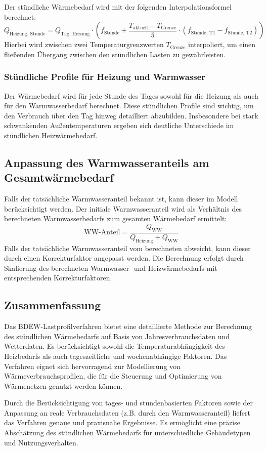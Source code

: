 Der stündliche Wärmebedarf wird mit der folgenden Interpolationsformel berechnet:
\[
Q_{\text{Heizung, Stunde}} = Q_{\text{Tag, Heizung}} \cdot \left( f_{\text{Stunde}} + \frac{T_{\text{aktuell}} - T_{\text{Grenze}}}{5} \cdot (f_{\text{Stunde, T1}} - f_{\text{Stunde, T2}}) \right)
\]
Hierbei wird zwischen zwei Temperaturgrenzwerten \( T_{\text{Grenze}} \) interpoliert, um einen fließenden Übergang zwischen den stündlichen Lasten zu gewährleisten.

\subsubsection{Stündliche Profile für Heizung und Warmwasser}
Der Wärmebedarf wird für jede Stunde des Tages sowohl für die Heizung als auch für den Warmwasserbedarf berechnet. Diese stündlichen Profile sind wichtig, um den Verbrauch über den Tag hinweg detailliert abzubilden. Insbesondere bei stark schwankenden Außentemperaturen ergeben sich deutliche Unterschiede im stündlichen Heizwärmebedarf.

\subsection{Anpassung des Warmwasseranteils am Gesamtwärmebedarf}
Falls der tatsächliche Warmwasseranteil bekannt ist, kann dieser im Modell berücksichtigt werden. Der initiale Warmwasseranteil wird als Verhältnis des berechneten Warmwasserbedarfs zum gesamten Wärmebedarf ermittelt:
\[
\text{WW-Anteil} = \frac{Q_{\text{WW}}}{Q_{\text{Heizung}} + Q_{\text{WW}}}
\]
Falls der tatsächliche Warmwasseranteil vom berechneten abweicht, kann dieser durch einen Korrekturfaktor angepasst werden. Die Berechnung erfolgt durch Skalierung des berechneten Warmwasser- und Heizwärmebedarfs mit entsprechenden Korrekturfaktoren.

\subsection{Zusammenfassung}
Das BDEW-Lastprofilverfahren bietet eine detaillierte Methode zur Berechnung des stündlichen Wärmebedarfs auf Basis von Jahresverbrauchsdaten und Wetterdaten. Es berücksichtigt sowohl die Temperaturabhängigkeit des Heizbedarfs als auch tageszeitliche und wochenabhängige Faktoren. Das Verfahren eignet sich hervorragend zur Modellierung von Wärmeverbrauchsprofilen, die für die Steuerung und Optimierung von Wärmenetzen genutzt werden können.

Durch die Berücksichtigung von tages- und stundenbasierten Faktoren sowie der Anpassung an reale Verbrauchsdaten (z.B. durch den Warmwasseranteil) liefert das Verfahren genaue und praxisnahe Ergebnisse. Es ermöglicht eine präzise Abschätzung des stündlichen Wärmebedarfs für unterschiedliche Gebäudetypen und Nutzungsverhalten.

